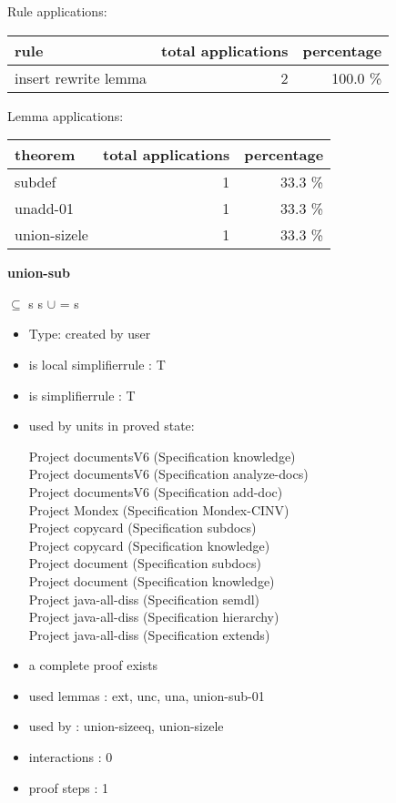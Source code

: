 \documentclass[a4paper]{article}
\begin{document}
Rule applications:

\begin{supertabular}{l|r|r}
rule	        & total applications & percentage \\ \hline
insert rewrite lemma & 2 & 100.0 \% \\

\end{supertabular}

Lemma applications:

\begin{supertabular}{l|r|r}
theorem	        & total applications & percentage \\ \hline
subdef & 1 & 33.3 \% \\
unadd-01 & 1 & 33.3 \% \\
union-sizele & 1 & 33.3 \% \\

\end{supertabular}
\pagebreak

{\LARGE\bf union-sub}\label{lemma-union-sub}

\medskip

 \Fol {} $\subseteq$ s \Imp s $\cup$  = s

\begin{itemize}

\item Type: created by user

\item is local simplifierrule : T
\item is simplifierrule : T
\item used by units in proved state:

Project documentsV6 (Specification knowledge) \\
Project documentsV6 (Specification analyze-docs) \\
Project documentsV6 (Specification add-doc) \\
Project Mondex (Specification Mondex-CINV) \\
Project copycard (Specification subdocs) \\
Project copycard (Specification knowledge) \\
Project document (Specification subdocs) \\
Project document (Specification knowledge) \\
Project java-all-diss (Specification semdl) \\
Project java-all-diss (Specification hierarchy) \\
Project java-all-diss (Specification extends)
\item       a complete proof exists
\item       used lemmas  : ext, unc, una, union-sub-01
\item       used by      : union-sizeeq, union-sizele
\item       interactions : 0
\item       proof steps  : 1
\end{itemize}
\end{document}
